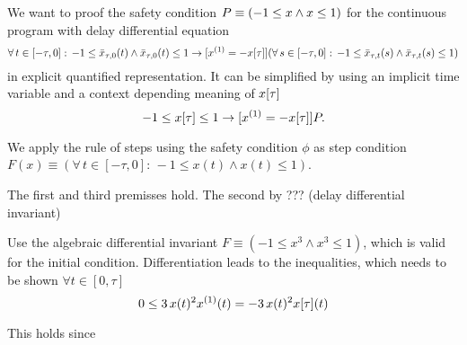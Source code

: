 \documentclass[10pt]{report}
\begin{document}
            We want to proof the safety condition $P\equiv(-1\leq x\wedge x\leq 1)$ for the continuous program with delay differential equation
            \begin{equation}
                \forall\,t\in[-\tau,0]:\,-1\leq\xbartaut{0}(t)\wedge\xbartaut{0}(t)\leq 1
                \rightarrow
                [\D{x}=-\xtau] (\forall\,s\in[-\tau,0]:\,-1\leq\xbartaut{t}(s)\wedge\xbartaut{t}(s)\leq 1)
            \end{equation}
            in explicit quantified representation. It can be simplified by using an implicit time variable and a context depending meaning of $x[\tau]$
            \begin{equation}
                -1\leq\xtau\leq 1 \rightarrow [\D{x}=-\xtau]\asfml.
            \end{equation}

            We apply the rule of steps using the safety condition $\phi$ as step condition $F(x)\equiv(\forall\,t\in[-\tau,0]:\,-1\leq x(t)\wedge x(t)\leq 1)$.

            The first and third premisses hold. The second by ??? (delay differential invariant)

            Use the algebraic differential invariant $F\equiv(-1\leq x^3\wedge x^3\leq1)$, which is valid for the initial condition. Differentiation leads to the inequalities, which needs to be shown $\forall t\in[0,\tau]$
            \begin{equation}
                0\leq 3\,x(t)^2 \D{x}(t) = -3\,x(t)^2 \xtau(t)
            \end{equation}

            This holds since



\nocite{*}


\end{document}
